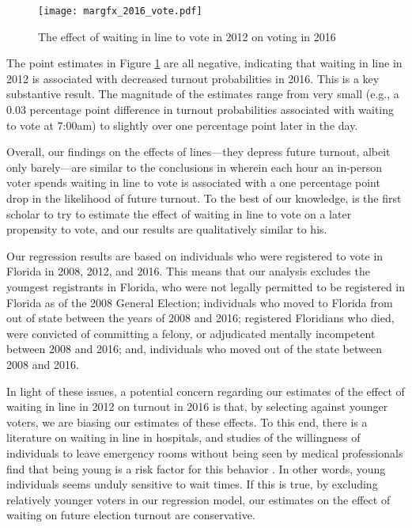 \documentclass[12pt,titlepage]{article}
\begin{document}
%

\begin{figure}[!ht]
\caption{The effect of waiting in line to vote in 2012 on voting in 2016}
  \label{fig:margfx2016}
  \centering
    \centering\texttt{[image: margfx\_2016\_vote.pdf]}
\end{figure}


The point estimates in Figure \ref{fig:margfx2016} are all negative,
indicating that waiting in line in 2012 is associated with decreased
turnout probabilities in 2016.  This is a key substantive result.  The
magnitude of the estimates range from very small (e.g., a 0.03
percentage point difference in turnout probabilities associated with
waiting to vote at 7:00am) to slightly over one percentage point later
in the day.

Overall, our findings on the effects of lines---they depress future
turnout, albeit only barely---are similar to the conclusions in
\citet{pettigrew:longlinesminorityprecincts} wherein each hour an
in-person voter spends waiting in line to vote is associated with a
one percentage point drop in the likelihood of future turnout.  To the
best of our knowledge,
\citeauthor{pettigrew:longlinesminorityprecincts} is the first scholar
to try to estimate the effect of waiting in line to vote on a later
propensity to vote, and our results are qualitatively similar to his.

Our regression results are based on individuals who were registered to
vote in Florida in 2008, 2012, and 2016.  This means that our analysis
excludes the youngest registrants in Florida, who were not legally
permitted to be registered in Florida as of the 2008 General Election;
individuals who moved to Florida from out of state between the years
of 2008 and 2016; registered Floridians who died, were convicted of
committing a felony, or adjudicated mentally incompetent between 2008
and 2016; and, individuals who moved out of the state between 2008 and
2016.

In light of these issues, a potential concern regarding our estimates
of the effect of waiting in line in 2012 on turnout in 2016 is that,
by selecting against younger voters, we are biasing our estimates of
these effects. To this end, there is a literature on waiting in line
in hospitals, and studies of the willingness of individuals to leave
emergency rooms without being seen by medical professionals find that
being young is a risk factor for this behavior
\citep{sunetal:lwbs,clareycooke:emergencyroomleave,shaikh:howlongwaiter}.
In other words, young individuals seems unduly sensitive to wait
times.  If this is true, by excluding relatively younger voters
in our regression model, our estimates on the effect of
waiting on future election turnout are conservative.
\end{document}
